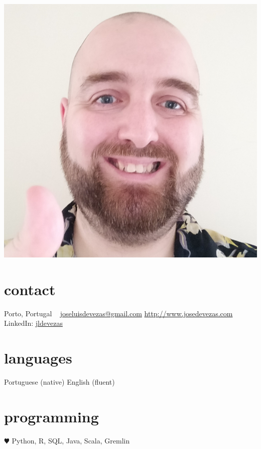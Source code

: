 \documentclass{friggeri-cv}
\begin{document}


\begin{aside} %
\includegraphics[width=\textwidth]{photo.jpg}
%
\section{contact}
Porto, Portugal
~
{\footnotesize \href{mailto:joseluisdevezas@gmail.com}{joseluisdevezas@gmail.com}
\href{http://www.josedevezas.com}{http://www.josedevezas.com} %
LinkedIn: \href{http://pt.linkedin.com/in/jldevezas/en}{jldevezas}}
%
\section{languages}
Portuguese (native)
English (fluent)
%
\section{programming}
{\color{red} $\varheartsuit$} Python, R, SQL, Java, Scala, Gremlin
\end{aside}
\end{document}
